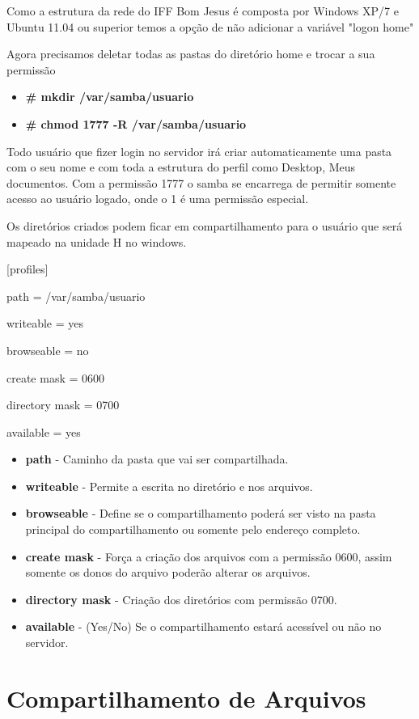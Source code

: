 Como a estrutura da rede do IFF Bom Jesus é composta por Windows XP/7 e Ubuntu 11.04 ou superior temos a opção de não adicionar a variável "logon home" 

Agora precisamos deletar todas as pastas do diretório home e trocar a sua permissão 

\begin{itemize}
	\item \textbf{\# mkdir /var/samba/usuario}
	\item \textbf{\# chmod 1777 -R /var/samba/usuario}
\end{itemize}

Todo usuário que fizer login no servidor irá criar automaticamente uma pasta com o seu nome e com toda a estrutura do perfil como Desktop, Meus documentos. Com a permissão 1777 o samba se encarrega de permitir somente acesso ao usuário logado, onde o 1 é uma permissão especial. 

Os diretórios criados podem ficar em compartilhamento para o usuário que será mapeado na unidade H no windows.

[profiles] 

	path = /var/samba/usuario 
	
	writeable = yes 
	
	browseable = no 
	
	create mask = 0600 
	
	directory mask = 0700 
	
	available = yes 

\begin{itemize}
	\item \textbf {path} - Caminho da pasta que vai ser compartilhada.
	\item \textbf {writeable} - Permite a escrita no diretório e nos arquivos.
	\item \textbf {browseable} - Define se o compartilhamento poderá ser visto na pasta principal do compartilhamento ou somente pelo endereço completo.
	\item \textbf {create mask} - Força a criação dos arquivos com a permissão 0600, assim somente os donos do arquivo poderão alterar os arquivos.
	\item \textbf {directory mask} - Criação dos diretórios com permissão 0700.
	\item \textbf{available} - (Yes/No) Se o compartilhamento estará acessível ou não no servidor.
\end{itemize}

\section{Compartilhamento de Arquivos}

